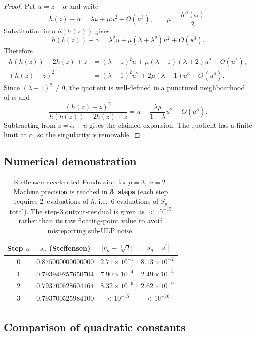 \documentclass[11pt,a4paper]{article}
\theoremstyle{definition}
\newcommand{\cbrt}[1]{\sqrt[3]{#1}}
\begin{document}
\begin{proof}
Put $u=z-\alpha$ and write
\[
  h(z)-\alpha=\lambda u+\mu u^2+O(u^3), \qquad
  \mu=\frac{h''(\alpha)}2 .
\]
Substitution into $h(h(z))$ gives
\[
  h(h(z))-\alpha
  =\lambda^2u+\mu(\lambda+\lambda^2)u^2+O(u^3).
\]
Therefore
\[
\begin{aligned}
  h(h(z))-2h(z)+z
  &=(\lambda-1)^2u+\mu(\lambda-1)(\lambda+2)u^2+O(u^3),\\
  (h(z)-z)^2
  &=(\lambda-1)^2u^2+2\mu(\lambda-1)u^3+O(u^4).
\end{aligned}
\]
Since $(\lambda-1)^2\ne0$, the quotient is well-defined in a punctured
neighbourhood of $\alpha$ and
\[
  \frac{(h(z)-z)^2}{h(h(z))-2h(z)+z}
  =
  u+\frac{\lambda\mu}{1-\lambda}u^2+O(u^3).
\]
Subtracting from $z=\alpha+u$ gives the claimed expansion. The quotient has a
finite limit at $\alpha$, so the singularity is removable.
\end{proof}

\subsection{Numerical demonstration}

\begin{table}[H]
\centering
\begin{tabular}{cccc}
\toprule
Step $n$ & $s_n$ (Steffensen) & $|v_n - \cbrt{2}|$ & $|s_n - s^*|$ \\
\midrule
0 & $0.875000000000000$ & $2.71 \times 10^{-1}$ & $8.13 \times 10^{-2}$ \\
1 & $0.793949257650704$ & $7.90 \times 10^{-4}$ & $2.49 \times 10^{-4}$ \\
2 & $0.793700528604164$ & $8.32 \times 10^{-9}$ & $2.62 \times 10^{-9}$ \\
3 & $0.793700525984100$ & $< 10^{-15}$ & $< 10^{-16}$ \\
\bottomrule
\end{tabular}
\caption{Steffensen-accelerated Pandrosion for $p=3$, $x=2$. Machine precision is reached in \textbf{3~steps} (each step requires 2~evaluations of $h$, i.e.\ 6 evaluations of $S_p$ total). The step-$3$ output-residual is given as $< 10^{-15}$ rather than its raw floating-point value to avoid misreporting sub-ULP noise.}
\label{tab:steff-numerical}
\end{table}

\subsection{Comparison of quadratic constants}
\end{document}
